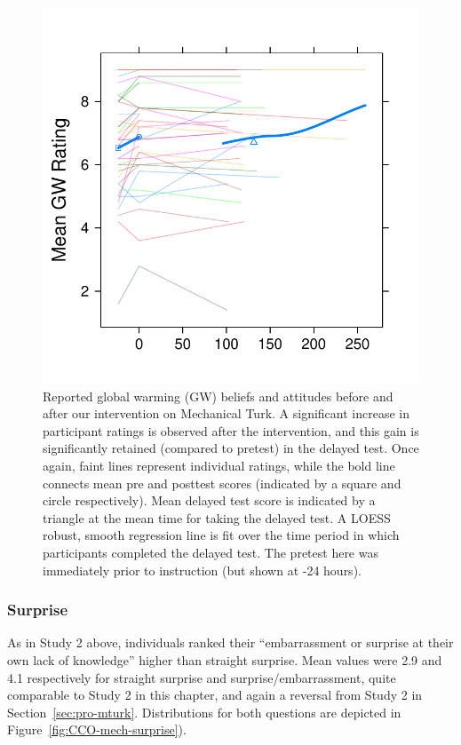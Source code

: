 \begin{figure}
    \centering
    \includegraphics{CCO-mech-GW.pdf}
    \caption{Reported global warming (GW) beliefs and attitudes before and after
        our intervention on Mechanical Turk. A significant increase in
        participant ratings is observed after the intervention, and this gain is
        significantly retained (compared to pretest) in the delayed test. Once
        again, faint lines represent individual ratings, while the bold line
        connects mean pre and posttest scores (indicated by a square and circle
        respectively).  Mean delayed test score is indicated by a triangle at
        the mean time for taking the delayed test. A LOESS robust, smooth
        regression line is fit over the time period in which participants
        completed the delayed test. The pretest here was immediately prior to
        instruction (but shown at -24 hours).}
    \label{fig:CCO-mech-GW}
\end{figure}


\subsubsection{Surprise}

As in Study 2 above, individuals ranked their “embarrassment or surprise at their own
lack of knowledge” higher than straight surprise. Mean values were 2.9 and 4.1
respectively for straight surprise and surprise/embarrassment, quite comparable
to Study 2 in this chapter, and again a reversal from Study 2 in
Section~\ref{sec:pro-mturk}. Distributions for both questions are depicted in
Figure~\ref{fig:CCO-mech-surprise}). 


